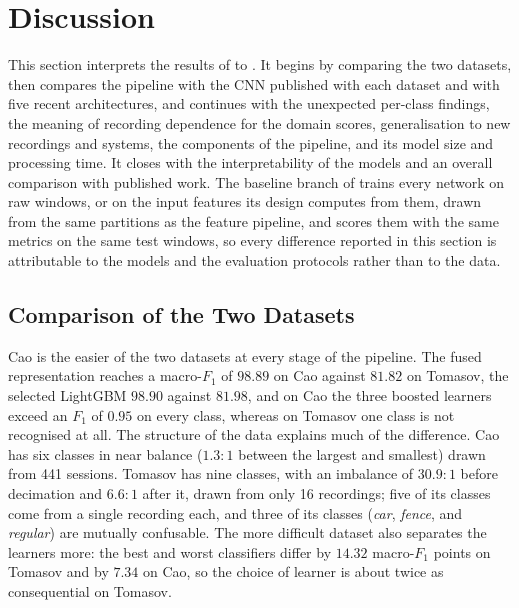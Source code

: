 \section{Discussion}
\label{sec:resDiscussion}
This section interprets the results of  to . It begins by comparing the two datasets, then compares the pipeline with the CNN published with each dataset and with five recent architectures, and continues with the unexpected per-class findings, the meaning of recording dependence for the domain scores, generalisation to new recordings and systems, the components of the pipeline, and its model size and processing time. It closes with the interpretability of the models and an overall comparison with published work. The baseline branch of  trains every network on raw windows, or on the input features its design computes from them, drawn from the same partitions as the feature pipeline, and scores them with the same metrics on the same test windows, so every difference reported in this section is attributable to the models and the evaluation protocols rather than to the data.

\subsection{Comparison of the Two Datasets}
\label{sec:resDatasetComparison}
Cao is the easier of the two datasets at every stage of the pipeline. The fused representation reaches a macro-$F_1$ of $98.89$ on Cao against $81.82$ on Tomasov, the selected LightGBM $98.90$ against $81.98$, and on Cao the three boosted learners exceed an $F_1$ of $0.95$ on every class, whereas on Tomasov one class is not recognised at all. The structure of the data explains much of the difference. Cao has six classes in near balance ($1.3{:}1$ between the largest and smallest) drawn from 441 sessions. Tomasov has nine classes, with an imbalance of $30.9{:}1$ before decimation and $6.6{:}1$ after it, drawn from only 16 recordings; five of its classes come from a single recording each, and three of its classes (\emph{car}, \emph{fence}, and \emph{regular}) are mutually confusable. The more difficult dataset also separates the learners more: the best and worst classifiers differ by $14.32$ macro-$F_1$ points on Tomasov and by $7.34$ on Cao, so the choice of learner is about twice as consequential on Tomasov.


